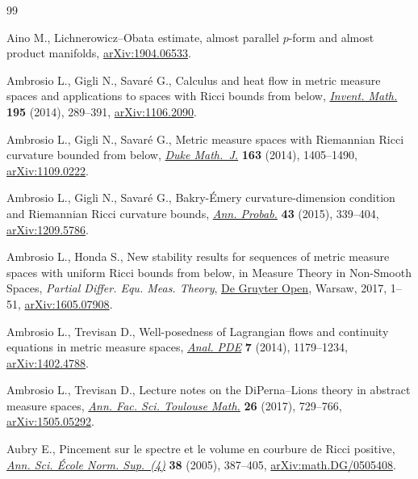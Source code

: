 \begin{thebibliography}{99}
\footnotesize\itemsep=0pt

Aino M., Lichnerowicz--{O}bata estimate, almost parallel $p$-form and almost
 product manifolds, \href{https://arxiv.org/abs/1904.06533}{arXiv:1904.06533}.

Ambrosio L., Gigli N., Savar\'e G., Calculus and heat flow in metric measure
 spaces and applications to spaces with {R}icci bounds from below,
 \href{https://doi.org/10.1007/s00222-013-0456-1}{\textit{Invent. Math.}} \textbf{195} (2014), 289--391, \href{https://arxiv.org/abs/1106.2090}{arXiv:1106.2090}.

Ambrosio L., Gigli N., Savar\'e G., Metric measure spaces with {R}iemannian
 {R}icci curvature bounded from below, \href{https://doi.org/10.1215/00127094-2681605}{\textit{Duke Math.~J.}} \textbf{163}
 (2014), 1405--1490, \href{https://arxiv.org/abs/1109.0222}{arXiv:1109.0222}.

Ambrosio L., Gigli N., Savar\'e G., Bakry-\'Emery curvature-dimension condition
 and {R}iemannian {R}icci curvature bounds, \href{https://doi.org/10.1214/14-AOP907}{\textit{Ann. Probab.}} \textbf{43}
 (2015), 339--404, \href{https://arxiv.org/abs/1209.5786}{arXiv:1209.5786}.

Ambrosio L., Honda S., New stability results for sequences of metric measure
 spaces with uniform {R}icci bounds from below, in Measure Theory in
 Non-Smooth Spaces, \textit{Partial Differ. Equ. Meas. Theory}, \href{https://doi.org/10.1515/9783110550832-001}{De Gruyter Open},
 Warsaw, 2017, 1--51, \href{https://arxiv.org/abs/1605.07908}{arXiv:1605.07908}.

Ambrosio L., Trevisan D., Well-posedness of {L}agrangian flows and continuity
 equations in metric measure spaces, \href{https://doi.org/10.2140/apde.2014.7.1179}{\textit{Anal. PDE}} \textbf{7} (2014),
 1179--1234, \href{https://arxiv.org/abs/1402.4788}{arXiv:1402.4788}.

Ambrosio L., Trevisan D., Lecture notes on the {D}i{P}erna--{L}ions theory in
 abstract measure spaces, \href{https://doi.org/10.5802/afst.1551}{\textit{Ann. Fac. Sci. Toulouse Math.}} \textbf{26}
 (2017), 729--766, \href{https://arxiv.org/abs/1505.05292}{arXiv:1505.05292}.

Aubry E., Pincement sur le spectre et le volume en courbure de {R}icci
 positive, \href{https://doi.org/10.1016/j.ansens.2005.01.002}{\textit{Ann. Sci. \'Ecole Norm. Sup.~(4)}} \textbf{38} (2005),
 387--405, \href{https://arxiv.org/abs/math.DG/0505408}{arXiv:math.DG/0505408}.


\end{thebibliography}
